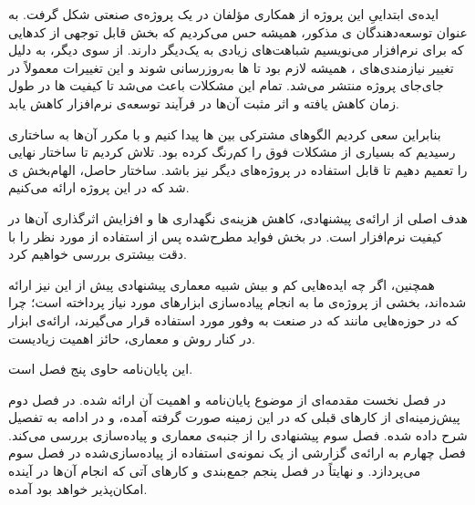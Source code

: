 ایده‌ی ابتداییِ این پروژه از همکاری مؤلفان در یک پروژه‌ی صنعتی شکل گرفت. به عنوان توسعه‌دهندگان ‌ی مذکور، همیشه حس می‌کردیم که بخش قابل توجهی از کدهایی که برای  نرم‌افزار می‌نویسیم شباهت‌های زیادی به یک‌دیگر دارند.
از سوی دیگر، به دلیل تغییر نیازمندی‌های ، همیشه لازم بود تا ‌ها به‌روزرسانی شوند و این تغییرات معمولاً در جای‌جای پروژه منتشر می‌شد. تمام این مشکلات باعث می‌شد تا کیفیت ‌ها در طول زمان کاهش یافته و اثر مثبت آن‌ها در فرآیند توسعه‌ی نرم‌افزار کاهش یابد.

بنابراین سعی کردیم الگوهای مشترکی بین ‌ها پیدا کنیم و با  مکرر آن‌ها به ساختاری رسیدیم که بسیاری از مشکلات فوق را کم‌رنگ کرده بود. تلاش کردیم تا ساختار نهایی را تعمیم دهیم تا قابل استفاده در پروژه‌های دیگر نیز باشد. ساختار حاصل، الهام‌بخش  ی شد که در این پروژه ارائه می‌کنیم.

هدف اصلی از ارائه‌ی   پیشنهادی، کاهش هزینه‌ی نگهداری ها و افزایش اثرگذاری آن‌ها در کیفیت نرم‌افزار است. در بخش  فواید مطرح‌شده پس از استفاده از  مورد نظر را با دقت بیشتری بررسی خواهیم کرد.

همچنین، اگر چه ایده‌هایی کم و بیش شبیه معماری  پیشنهادی پیش از این نیز ارائه شده‌اند، بخشی از پروژه‌ی ما به انجام پیاده‌سازی ابزارهای مورد نیاز پرداخته است؛ چرا که در حوزه‌هایی مانند  که در صنعت به وفور مورد استفاده قرار می‌گیرند، ارائه‌ی ابزار در کنار روش و معماری، حائز اهمیت زیادیست.


این پایان‌نامه حاوی پنج فصل است.

در فصل نخست مقدمه‌ای از موضوع پایان‌نامه و اهمیت آن ارائه شده. در فصل دوم پیش‌زمینه‌ای از کارهای قبلی که در این زمینه صورت گرفته آمده، و در ادامه  به تفصیل شرح داده شده. فصل سوم   پیشنهادی را از جنبه‌ی معماری و پیاده‌سازی بررسی می‌کند. فصل چهارم به ارائه‌ی گزارشی از یک نمونه‌ی استفاده از  پیاده‌سازی‌شده در فصل سوم می‌پردازد. و نهایتاً در فصل پنجم جمع‌بندی و کارهای آتی که انجام آن‌ها در آینده امکان‌پذیر خواهد بود آمده.


